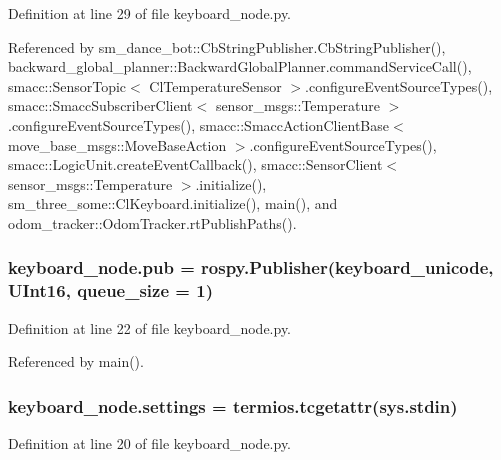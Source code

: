 Definition at line 29 of file keyboard\+\_\+node.\+py.



Referenced by sm\+\_\+dance\+\_\+bot\+::\+Cb\+String\+Publisher.\+Cb\+String\+Publisher(), backward\+\_\+global\+\_\+planner\+::\+Backward\+Global\+Planner.\+command\+Service\+Call(), smacc\+::\+Sensor\+Topic$<$ Cl\+Temperature\+Sensor $>$.\+configure\+Event\+Source\+Types(), smacc\+::\+Smacc\+Subscriber\+Client$<$ sensor\+\_\+msgs\+::\+Temperature $>$.\+configure\+Event\+Source\+Types(), smacc\+::\+Smacc\+Action\+Client\+Base$<$ move\+\_\+base\+\_\+msgs\+::\+Move\+Base\+Action $>$.\+configure\+Event\+Source\+Types(), smacc\+::\+Logic\+Unit.\+create\+Event\+Callback(), smacc\+::\+Sensor\+Client$<$ sensor\+\_\+msgs\+::\+Temperature $>$.\+initialize(), sm\+\_\+three\+\_\+some\+::\+Cl\+Keyboard.\+initialize(), main(), and odom\+\_\+tracker\+::\+Odom\+Tracker.\+rt\+Publish\+Paths().

\subsubsection[{\texorpdfstring{pub}{pub}}]{\setlength{\rightskip}{0pt plus 5cm}keyboard\+\_\+node.\+pub = rospy.\+Publisher(\textquotesingle{}keyboard\+\_\+unicode\textquotesingle{}, U\+Int16, queue\+\_\+size = 1)}\hypertarget{namespacekeyboard__node_af6db75302d320b64f2d03f7b84404a9f}{}\label{namespacekeyboard__node_af6db75302d320b64f2d03f7b84404a9f}


Definition at line 22 of file keyboard\+\_\+node.\+py.



Referenced by main().

\subsubsection[{\texorpdfstring{settings}{settings}}]{\setlength{\rightskip}{0pt plus 5cm}keyboard\+\_\+node.\+settings = termios.\+tcgetattr(sys.\+stdin)}\hypertarget{namespacekeyboard__node_aaf29d185963f7dbed690d072de1a0b17}{}\label{namespacekeyboard__node_aaf29d185963f7dbed690d072de1a0b17}


Definition at line 20 of file keyboard\+\_\+node.\+py.

